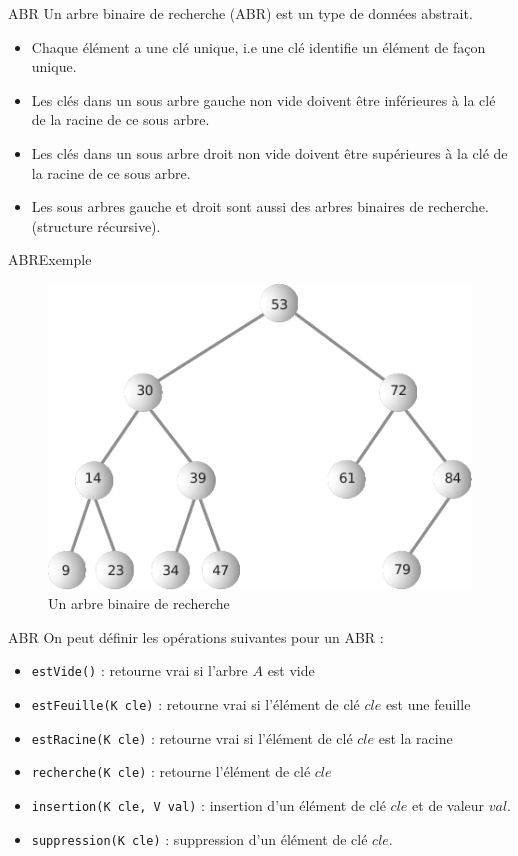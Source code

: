 \documentclass[12pt,a4paper]{beamer}
\newcommand{\hl}[1]{\textcolor{blueemph}{#1}}
\begin{document}
\begin{frame}{ABR}
Un \hl{arbre binaire de recherche} (ABR) est un type de données abstrait.
\begin{itemize}
\item Chaque élément a une clé unique, i.e une clé identifie un
élément de façon unique.
\item Les clés dans un sous arbre gauche non vide doivent être
inférieures à la clé de la racine de ce sous arbre.
\item Les clés dans un sous arbre droit non vide doivent être
supérieures à la clé de la racine de ce sous arbre.
\item Les sous arbres gauche et droit sont aussi des arbres
binaires de recherche. (structure récursive).
\end{itemize}

\end{frame}

\begin{frame}{ABR}{Exemple}
\begin{figure}
\includegraphics[scale=1]{figs/abr}
\caption{Un arbre binaire de recherche}
\end{figure}

\end{frame}

\begin{frame}{ABR}
On peut définir les opérations suivantes pour un ABR :
\begin{itemize}
\item \texttt{estVide()} : retourne vrai si l'arbre $A$ est vide
\item \texttt{estFeuille(K cle)} : retourne vrai si l'élément de clé $cle$ est une feuille\item \texttt{estRacine(K cle)} : retourne vrai si l'élément de clé $cle$ est la racine
\item \texttt{recherche(K cle)} : retourne l'élément de clé $cle$
\item \texttt{insertion(K cle, V val)} : insertion d'un élément de clé $cle$ et de valeur $val$.
\item \texttt{suppression(K cle)} : suppression d'un élément de clé $cle$.

\end{itemize}
\end{frame}
\end{document}
